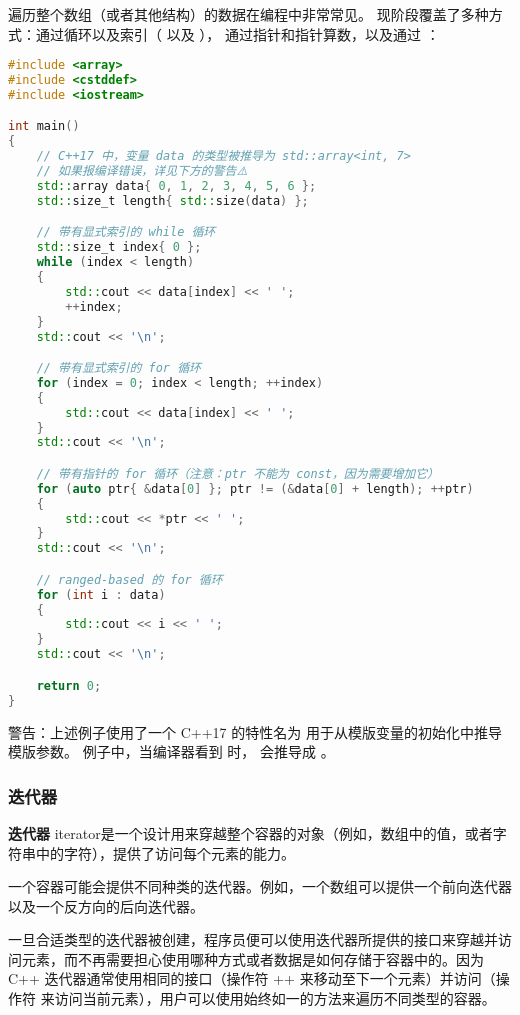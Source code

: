 \documentclass[../../LearnCpp.tex]{subfiles}
\begin{document}

遍历整个数组（或者其他结构）的数据在编程中非常常见。
现阶段覆盖了多种方式：通过循环以及索引（ 以及 ），
通过指针和指针算数，以及通过 ：

\begin{lstlisting}[language=C++]
#include <array>
#include <cstddef>
#include <iostream>

int main()
{
    // C++17 中，变量 data 的类型被推导为 std::array<int, 7>
    // 如果报编译错误，详见下方的警告⚠️
    std::array data{ 0, 1, 2, 3, 4, 5, 6 };
    std::size_t length{ std::size(data) };

    // 带有显式索引的 while 循环
    std::size_t index{ 0 };
    while (index < length)
    {
        std::cout << data[index] << ' ';
        ++index;
    }
    std::cout << '\n';

    // 带有显式索引的 for 循环
    for (index = 0; index < length; ++index)
    {
        std::cout << data[index] << ' ';
    }
    std::cout << '\n';

    // 带有指针的 for 循环（注意：ptr 不能为 const，因为需要增加它）
    for (auto ptr{ &data[0] }; ptr != (&data[0] + length); ++ptr)
    {
        std::cout << *ptr << ' ';
    }
    std::cout << '\n';

    // ranged-based 的 for 循环
    for (int i : data)
    {
        std::cout << i << ' ';
    }
    std::cout << '\n';

    return 0;
}
\end{lstlisting}

警告：上述例子使用了一个 C++17 的特性名为  用于从模版变量的初始化中推导模版参数。
例子中，当编译器看到  时，
会推导成 。

\subsubsection*{迭代器}

\textbf{迭代器} iterator是一个设计用来穿越整个容器的对象（例如，数组中的值，或者字符串中的字符），提供了访问每个元素的能力。

一个容器可能会提供不同种类的迭代器。例如，一个数组可以提供一个前向迭代器以及一个反方向的后向迭代器。

一旦合适类型的迭代器被创建，程序员便可以使用迭代器所提供的接口来穿越并访问元素，而不再需要担心使用哪种方式或者数据是如何存储于容器中的。因为 C++ 迭代器通常使用相同的接口（操作符 ++ 来移动至下一个元素）并访问（操作符 \* 来访问当前元素），用户可以使用始终如一的方法来遍历不同类型的容器。
\end{document}
